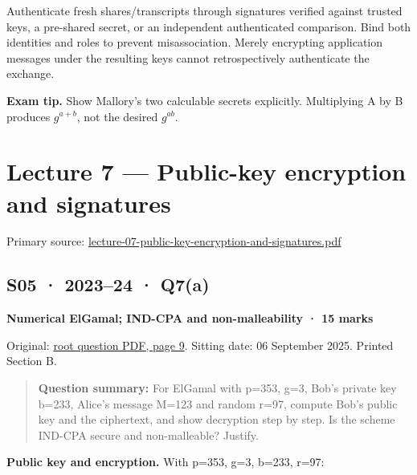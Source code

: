 \documentclass[11pt,a4paper]{article}
\begin{document}
Authenticate fresh shares/\allowbreak{}transcripts through signatures verified against trusted keys,\allowbreak{} a pre-shared secret,\allowbreak{} or an independent authenticated comparison. Bind both identities and roles to prevent misassociation. Merely encrypting application messages under the resulting keys cannot retrospectively authenticate the exchange.



{\color{ForestGreen}\textbf{Exam tip.} Show Mallory’s two calculable secrets explicitly. Multiplying A by B produces \(g^{a+b}\),\allowbreak{} not the desired \(g^{ab}\).}



\clearpage
\section{Lecture 7 — Public-key encryption and signatures}

Primary source: \href{../slides/lecture-07-public-key-encryption-and-signatures.pdf}{lecture-07-public-key-encryption-and-signatures.\allowbreak{}pdf}




\subsection{S05 · 2023–24 · Q7(a)}\label{s05}

\textbf{Numerical ElGamal; IND-CPA and non-malleability · 15 marks}


Original: \href{../../CSE405-Security_Merged.pdf\#page=9}{root question PDF,\allowbreak{} page 9}. Sitting date: 06 September 2025. Printed Section B.



\begin{quote}\small

\textbf{Question summary:} For ElGamal with p=\allowbreak{}353,\allowbreak{} g=\allowbreak{}3,\allowbreak{} Bob’s private key b=\allowbreak{}233,\allowbreak{} Alice’s message M=\allowbreak{}123 and random r=\allowbreak{}97,\allowbreak{} compute Bob’s public key and the ciphertext,\allowbreak{} and show decryption step by step. Is the scheme IND-CPA secure and non-malleable? Justify.



\end{quote}

\textbf{Public key and encryption.} With p=\allowbreak{}353,\allowbreak{} g=\allowbreak{}3,\allowbreak{} b=\allowbreak{}233,\allowbreak{} r=\allowbreak{}97:
\end{document}
